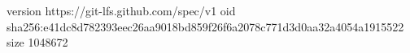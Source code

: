 version https://git-lfs.github.com/spec/v1
oid sha256:e41dc8d782393eec26aa9018bd859f26f6a2078c771d3d0aa32a4054a1915522
size 1048672
